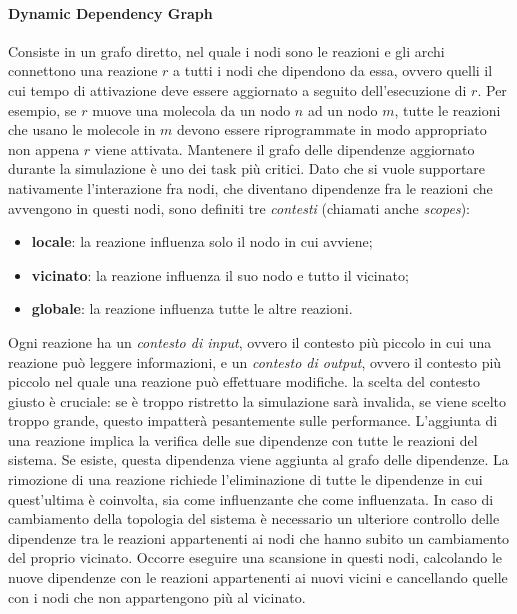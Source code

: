 \documentclass[12pt,a4paper,openright,twoside]{book}
\begin{document}
\paragraph{Dynamic Dependency Graph}
Consiste in un grafo diretto, nel quale i nodi sono le reazioni e gli archi connettono una reazione $r$ a tutti i nodi che dipendono da essa, ovvero quelli il cui tempo di attivazione deve essere aggiornato a seguito dell'esecuzione di $r$. Per esempio, se $r$ muove una molecola da un nodo $n$ ad un nodo $m$, tutte le reazioni che usano le molecole in $m$ devono essere riprogrammate in modo appropriato non appena $r$ viene attivata.
Mantenere il grafo delle dipendenze aggiornato durante la simulazione è uno dei task più critici. Dato che si vuole supportare nativamente l'interazione fra nodi, che diventano dipendenze fra le reazioni che avvengono in questi nodi, sono definiti tre \textit{contesti} (chiamati anche \textit{scopes}): 
\begin{itemize}
    \item \textbf{locale}: la reazione influenza solo il nodo in cui avviene; 
    \item \textbf{vicinato}: la reazione influenza il suo nodo e tutto il vicinato; 
    \item \textbf{globale}: la reazione influenza tutte le altre reazioni. 
\end{itemize}
Ogni reazione ha un \textit{contesto di input}, ovvero il contesto più piccolo in cui una reazione può leggere informazioni, e un \textit{contesto di output}, ovvero il contesto più piccolo nel quale una reazione può effettuare modifiche. 
la scelta del contesto giusto è cruciale: se è troppo ristretto la simulazione sarà invalida, se viene scelto troppo grande, questo impatterà pesantemente sulle performance. 
L'aggiunta di una reazione implica la verifica delle sue dipendenze con tutte le reazioni del sistema. Se esiste, questa dipendenza viene aggiunta al grafo delle dipendenze. La rimozione di una reazione richiede l'eliminazione di tutte le dipendenze in cui quest'ultima è coinvolta, sia come influenzante che come influenzata. 
In caso di cambiamento della topologia del sistema è necessario un ulteriore controllo delle dipendenze tra le reazioni appartenenti ai nodi che hanno subito un cambiamento del proprio vicinato. Occorre eseguire una scansione in questi nodi, calcolando le nuove dipendenze con le reazioni appartenenti ai nuovi vicini e cancellando quelle con i nodi che non appartengono più al vicinato. 







\backmatter




\end{document}
